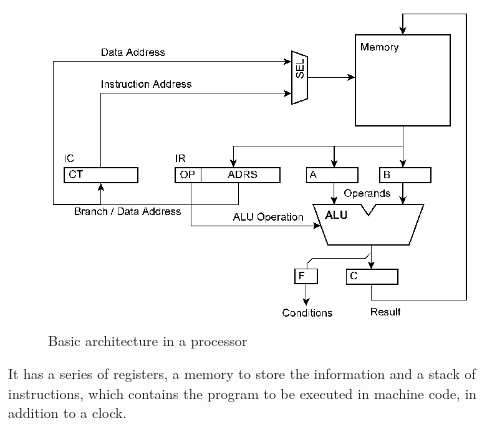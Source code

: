 \begin{center}
	\begin{figure}[H]
		\center
		\includegraphics[scale=0.3]{imagenes/EstadoArte/processor.png}
		\caption{Basic architecture in a processor}
		\label{fig:arquitectura_procesador}
	\end{figure} 
\end{center}


It has a series of registers, a memory to store the information and a stack of instructions, which contains the program to be executed in machine code, in addition to a clock.\newline

